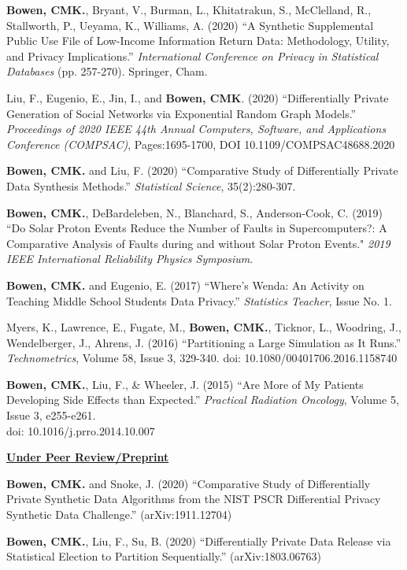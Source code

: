 \documentclass[11pt, letterpaper, roman]{moderncv} %
\begin{document}
\begin{etaremune}[topsep=0pt, itemsep=3pt, partopsep=0pt, parsep=0pt]
    \item \textbf{Bowen, CMK.}, Bryant, V., Burman, L., Khitatrakun, S., McClelland, R., Stallworth, P., Ueyama, K., Williams, A. (2020) ``A Synthetic Supplemental Public Use File of Low-Income Information Return Data: Methodology, Utility, and Privacy Implications.'' \textit{International Conference on Privacy in Statistical Databases} (pp. 257-270). Springer, Cham.
    
    \item Liu, F., Eugenio, E., Jin, I., and \textbf{Bowen, CMK}. (2020) ``Differentially Private Generation of Social Networks via Exponential Random Graph Models.'' \textit{Proceedings of 2020 IEEE 44th Annual Computers, Software, and Applications Conference (COMPSAC)}, Pages:1695-1700, DOI 10.1109/COMPSAC48688.2020

    \item \textbf{Bowen, CMK.} and Liu, F. (2020) ``Comparative Study of Differentially Private Data Synthesis Methods.'' \textit{Statistical Science}, 35(2):280-307.

    \item \textbf{Bowen, CMK.}, DeBardeleben, N., Blanchard, S., Anderson-Cook, C. (2019) ``Do Solar Proton Events Reduce the Number of Faults in Supercomputers?: A Comparative Analysis of Faults during and without Solar Proton Events." \textit{2019 IEEE International Reliability Physics Symposium}.

    \item \textbf{Bowen, CMK.} and Eugenio, E. (2017) ``Where's Wenda:  An Activity on Teaching Middle School Students Data Privacy.'' \textit{Statistics Teacher}, Issue No. 1.
    
    \item Myers, K., Lawrence, E., Fugate, M., \textbf{Bowen, CMK.}, Ticknor, L., Woodring, J., Wendelberger, J., Ahrens, J. (2016) ``Partitioning a Large Simulation as It Runs.'' \textit{Technometrics}, Volume 58, Issue 3, 329-340. 
    doi: 10.1080/00401706.2016.1158740

    \item \textbf{Bowen, CMK.}, Liu, F., \& Wheeler, J. (2015) ``Are More of My Patients Developing Side Effects than Expected.'' \textit{Practical Radiation Oncology}, Volume 5, Issue 3, e255-e261.\\
    doi: 10.1016/j.prro.2014.10.007
    
\vspace{4pt}
\hspace{-0.30in}\noindent\underline{\textbf{Under Peer Review/Preprint}}
    \item \textbf{Bowen, CMK.} and Snoke, J. (2020) ``Comparative Study of Differentially Private Synthetic Data Algorithms from the NIST PSCR Differential Privacy Synthetic Data Challenge.''
    (arXiv:1911.12704)

    \item \textbf{Bowen, CMK.}, Liu, F., Su, B. (2020) ``Differentially Private Data Release via Statistical Election to Partition Sequentially.''
    (arXiv:1803.06763)
\end{etaremune}
\end{document}
